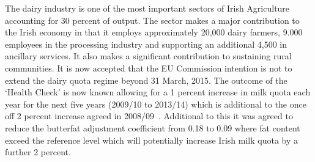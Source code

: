 \documentclass[12pt]{report}
\begin{document}
%
%
%
%




The dairy industry is one of the most important sectors of Irish Agriculture accounting for 30 percent of output. The sector makes a major contribution to the Irish economy in that it employs approximately 20,000 dairy farmers, 9.000 employees in the processing industry and supporting an additional 4,500 in ancillary services. It also makes a significant contribution to sustaining rural communities. %
It is now accepted that the EU Commission intention is not to extend the dairy quota regime beyond 31 March, 2015. The outcome of the ‘Health Check’ is now known allowing for a 1 percent increase in milk quota each year for the next five years (2009/10 to 2013/14) which is additional to the once off 2 percent increase agreed in 2008/09~\citep{eucom09}. Additional to this it was agreed to reduce the butterfat adjustment coefficient from 0.18 to 0.09 where fat content exceed the reference level which will potentially increase Irish milk quota by a further 2 percent. 
\end{document}
